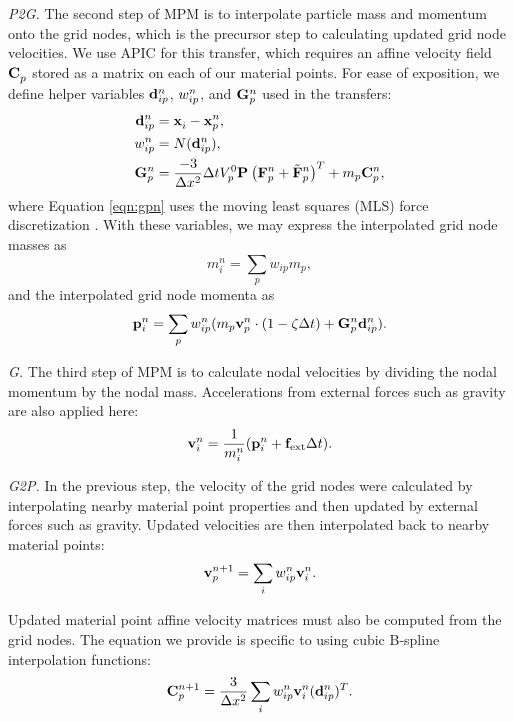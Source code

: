 \emph{P2G.} The second step of MPM is to interpolate particle mass and momentum onto the grid nodes, which is the precursor step to calculating updated grid node velocities.
We use APIC \citep{2015-APIC, jiang2017angular} for this transfer, which requires an affine velocity field $\mathbf{C}_{p} ^{ }$ stored as a matrix on each of our material points.
For ease of exposition, we define helper variables $\mathbf{d}_{i p} ^{n}$, $w_{i p} ^{n}$, and $\mathbf{G}_{p} ^{n}$ used in the transfers:
\begin{align}
    \mathbf{d}_{i p} ^{n} & = \mathbf{x}_{i} ^{ } - \mathbf{x}_{p} ^{n} , \\
    w_{i p} ^{n} & = N(\mathbf{d}_{i p} ^{n}) , \\
    \mathbf{G}_{p} ^{n} & = \frac{-3}{\Delta x^2} \Delta t V_{p} ^0 \mathbf{P}_{ } ^{ }\left( \mathbf{F}_{p} ^{n}+\tilde{\mathbf{F}}_{p} ^{n} \right) ^{T} + m_p \mathbf{C}_{p} ^{n} , \label{eqn:gpn}
\end{align}
where Equation \ref{eqn:gpn} uses the moving least squares (MLS) force discretization \citep{2018-MLSMPM,2018-ChainQueen}. 
With these variables, we may express the interpolated grid node masses as
\begin{equation}
    m_i ^n =  \sum_p w_{i p} m_p,
\end{equation}
and the interpolated grid node momenta as
\begin{equation}
    \mathbf{p}_i ^{n} = \sum_p w_{i p} ^{n}(m_p \mathbf{v}_{p} ^{n} \cdot(1-\zeta \Delta t) + \mathbf{G}_{p} ^{n} \mathbf{d}_{i p} ^{n}) .
    \label{eqn:gridp}
\end{equation}

\emph{G.} The third step of {MPM} is to calculate nodal velocities by dividing the nodal momentum by the nodal mass. Accelerations from external forces such as gravity are also applied here:
\begin{equation}
    \mathbf{v}_{i} ^{n} = \frac{1}{m_i ^n}(\mathbf{p}_i ^{n} + \mathbf{f}_{\text{ext}} \Delta t) .
\end{equation}

\emph{G2P.} In the previous step, the velocity of the grid nodes were calculated by interpolating nearby material point properties and then updated by external forces such as gravity. 
Updated velocities are then interpolated back to nearby material points:
\begin{equation}
    \mathbf{v}_{p} ^{n+1} = \sum_i w_{i p} ^{n} \mathbf{v}_{i} ^{n} .
\end{equation}

Updated material point affine velocity matrices \citep{2015-APIC, jiang2017angular} must also be computed from the grid nodes. 
The equation we provide is specific to using cubic B-spline interpolation functions:
\begin{equation}
    \mathbf{C}_{p} ^{n+1} = \frac{3}{\Delta x^2} \sum_i w_{i p} ^{n} \mathbf{v}_{i} ^{n} (\mathbf{d}_{i p} ^{n}) ^{T} .
\end{equation}

